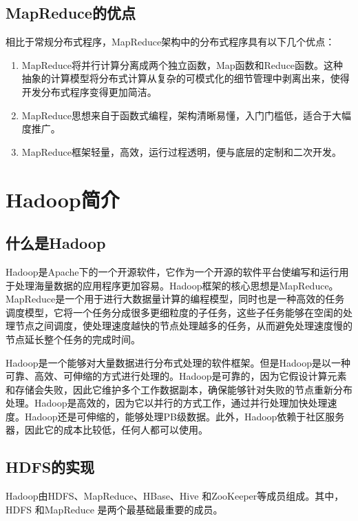\subsection{MapReduce的优点}
相比于常规分布式程序，MapReduce架构中的分布式程序具有以下几个优点：
\begin{enumerate}

\item MapReduce将并行计算分离成两个独立函数，Map函数和Reduce函数。这种抽象的计算模型将分布式计算从复杂的可模式化的细节管理中剥离出来，使得开发分布式程序变得更加简洁。

\item MapReduce思想来自于函数式编程，架构清晰易懂，入门门槛低，适合于大幅度推广。

\item MapReduce框架轻量，高效，运行过程透明，便与底层的定制和二次开发。

\end{enumerate}


\section{Hadoop简介}

\subsection{什么是Hadoop}
Hadoop是Apache下的一个开源软件，它作为一个开源的软件平台使编写和运行用于处理海量数据的应用程序更加容易。Hadoop框架的核心思想是MapReduce。MapReduce是一个用于进行大数据量计算的编程模型，同时也是一种高效的任务调度模型，它将一个任务分成很多更细粒度的子任务，这些子任务能够在空闺的处理节点之间调度，使处理速度越快的节点处理越多的任务，从而避免处理速度慢的节点延长整个任务的完成时间。

Hadoop是一个能够对大量数据进行分布式处理的软件框架。但是Hadoop是以一种可靠、高效、可伸缩的方式进行处理的。Hadoop是可靠的，因为它假设计算元素和存储会失败，因此它维护多个工作数据副本，确保能够针对失败的节点重新分布处理。Hadoop是高效的，因为它以并行的方式工作，通过并行处理加快处理速度。Hadoop还是可伸缩的，能够处理PB级数据。此外，Hadoop依赖于社区服务器，因此它的成本比较低，任何人都可以使用。

\subsection{HDFS的实现}
Hadoop由HDFS、MapReduce、HBase、Hive 和ZooKeeper等成员组成。其中，HDFS 和MapReduce 是两个最基础最重要的成员。

